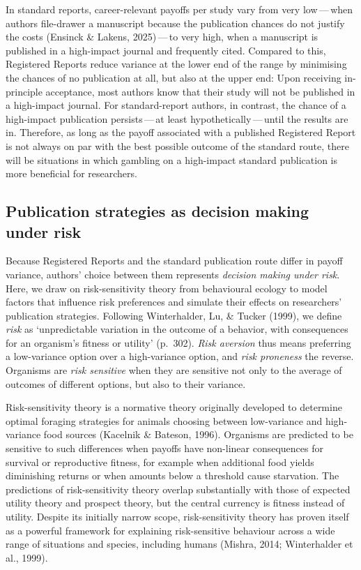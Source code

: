 \documentclass[
  british,
  a4paper,
  ,man,floatsintext]{apa6}
\begin{document}
In standard reports, career-relevant payoffs per study vary from very low\(\,\)---\(\,\)when authors file-drawer a manuscript because the publication chances do not justify the costs (Ensinck \& Lakens, 2025)\(\,\)---\(\,\)to very high, when a manuscript is published in a high-impact journal and frequently cited.
Compared to this, Registered Reports reduce variance at the lower end of the range by minimising the chances of no publication at all, but also at the upper end:
Upon receiving in-principle acceptance, most authors know that their study will not be published in a high-impact journal.
For standard-report authors, in contrast, the chance of a high-impact publication persists\(\,\)---\(\,\)at least hypothetically\(\,\)---\(\,\)until the results are in.
Therefore, as long as the payoff associated with a published Registered Report is not always on par with the best possible outcome of the standard route, there will be situations in which gambling on a high-impact standard publication is more beneficial for researchers.

\subsection{Publication strategies as decision making under risk}\label{publication-strategies-as-decision-making-under-risk}

Because Registered Reports and the standard publication route differ in payoff variance, authors' choice between them represents \emph{decision making under risk}.
Here, we draw on risk-sensitivity theory from behavioural ecology to model factors that influence risk preferences and simulate their effects on researchers' publication strategies.
Following Winterhalder, Lu, \& Tucker (1999), we define \emph{risk} as `unpredictable variation in the outcome of a behavior, with consequences for an organism's fitness or utility' (p.~302).
\emph{Risk aversion} thus means preferring a low-variance option over a high-variance option, and \emph{risk proneness} the reverse.
Organisms are \emph{risk sensitive} when they are sensitive not only to the average of outcomes of different options, but also to their variance.

Risk-sensitivity theory is a normative theory originally developed to determine optimal foraging strategies for animals choosing between low-variance and high-variance food sources (Kacelnik \& Bateson, 1996).
Organisms are predicted to be sensitive to such differences when payoffs have non-linear consequences for survival or reproductive fitness, for example when additional food yields diminishing returns or when amounts below a threshold cause starvation.
The predictions of risk-sensitivity theory overlap substantially with those of expected utility theory and prospect theory, but the central currency is fitness instead of utility.
Despite its initially narrow scope, risk-sensitivity theory has proven itself as a powerful framework for explaining risk-sensitive behaviour across a wide range of situations and species, including humans (Mishra, 2014; Winterhalder et al., 1999).
\end{document}
